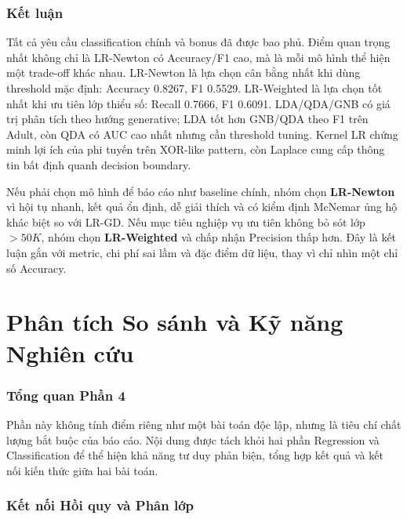 \documentclass[12pt,a4paper]{article}
\let\oldpart\part
\renewcommand{\part}{%
  \setcounter{section}{0}%
  \setcounter{subsection}{0}%
  \oldpart
}
\begin{document}
\newpage
\begin{samepage}
\section{Kết luận}

Tất cả yêu cầu classification chính và bonus đã được bao phủ. Điểm quan trọng nhất không chỉ là LR-Newton có Accuracy/F1 cao, mà là mỗi mô hình thể hiện một trade-off khác nhau. LR-Newton là lựa chọn cân bằng nhất khi dùng threshold mặc định: Accuracy 0.8267, F1 0.5529. LR-Weighted là lựa chọn tốt nhất khi ưu tiên lớp thiểu số: Recall 0.7666, F1 0.6091. LDA/QDA/GNB có giá trị phân tích theo hướng generative; LDA tốt hơn GNB/QDA theo F1 trên Adult, còn QDA có AUC cao nhất nhưng cần threshold tuning. Kernel LR chứng minh lợi ích của phi tuyến trên XOR-like pattern, còn Laplace cung cấp thông tin bất định quanh decision boundary.

Nếu phải chọn mô hình để báo cáo như baseline chính, nhóm chọn \textbf{LR-Newton} vì hội tụ nhanh, kết quả ổn định, dễ giải thích và có kiểm định McNemar ủng hộ khác biệt so với LR-GD. Nếu mục tiêu nghiệp vụ ưu tiên không bỏ sót lớp $>50K$, nhóm chọn \textbf{LR-Weighted} và chấp nhận Precision thấp hơn. Đây là kết luận gắn với metric, chi phí sai lầm và đặc điểm dữ liệu, thay vì chỉ nhìn một chỉ số Accuracy.
\end{samepage}

\newpage
\part{Phân tích So sánh và Kỹ năng Nghiên cứu}

\section*{Tổng quan Phần 4}

Phần này không tính điểm riêng như một bài toán độc lập, nhưng là tiêu chí chất lượng bắt buộc của báo cáo. Nội dung được tách khỏi hai phần Regression và Classification để thể hiện khả năng tư duy phản biện, tổng hợp kết quả và kết nối kiến thức giữa hai bài toán.

\section{Kết nối Hồi quy và Phân lớp}
\end{document}
